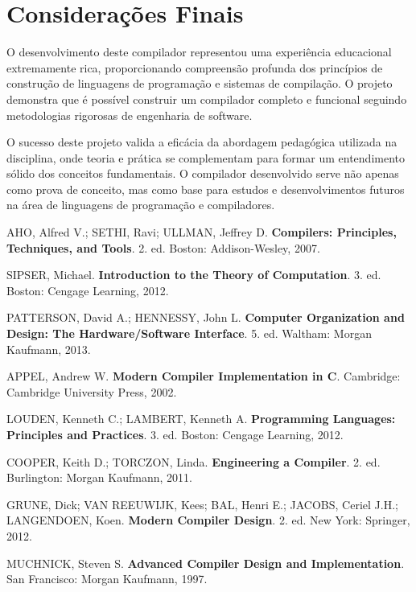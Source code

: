 \documentclass[
	12pt,				%
	oneside,
	a4paper,			%
	english,			%
	french,				%
	spanish,			%
	brazil,				%
	]{abntex2}
\begin{document}
\section{Considerações Finais}

O desenvolvimento deste compilador representou uma experiência educacional extremamente rica, proporcionando compreensão profunda dos princípios de construção de linguagens de programação e sistemas de compilação. O projeto demonstra que é possível construir um compilador completo e funcional seguindo metodologias rigorosas de engenharia de software.

O sucesso deste projeto valida a eficácia da abordagem pedagógica utilizada na disciplina, onde teoria e prática se complementam para formar um entendimento sólido dos conceitos fundamentais. O compilador desenvolvido serve não apenas como prova de conceito, mas como base para estudos e desenvolvimentos futuros na área de linguagens de programação e compiladores.


\begin{thebibliography}{9}

AHO, Alfred V.; SETHI, Ravi; ULLMAN, Jeffrey D.
\textbf{Compilers: Principles, Techniques, and Tools}.
2. ed. Boston: Addison-Wesley, 2007.

SIPSER, Michael.
\textbf{Introduction to the Theory of Computation}.
3. ed. Boston: Cengage Learning, 2012.

PATTERSON, David A.; HENNESSY, John L.
\textbf{Computer Organization and Design: The Hardware/Software Interface}.
5. ed. Waltham: Morgan Kaufmann, 2013.

APPEL, Andrew W.
\textbf{Modern Compiler Implementation in C}.
Cambridge: Cambridge University Press, 2002.

LOUDEN, Kenneth C.; LAMBERT, Kenneth A.
\textbf{Programming Languages: Principles and Practices}.
3. ed. Boston: Cengage Learning, 2012.

COOPER, Keith D.; TORCZON, Linda.
\textbf{Engineering a Compiler}.
2. ed. Burlington: Morgan Kaufmann, 2011.

GRUNE, Dick; VAN REEUWIJK, Kees; BAL, Henri E.; JACOBS, Ceriel J.H.; LANGENDOEN, Koen.
\textbf{Modern Compiler Design}.
2. ed. New York: Springer, 2012.

MUCHNICK, Steven S.
\textbf{Advanced Compiler Design and Implementation}.
San Francisco: Morgan Kaufmann, 1997.

\end{thebibliography}

\end{document}
